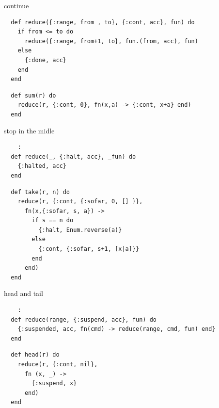 \begin{frame}[fragile]{continue}

  
\begin{verbatim}
  def reduce({:range, from , to}, {:cont, acc}, fun) do
    if from <= to do
      reduce({:range, from+1, to}, fun.(from, acc), fun)
    else
      {:done, acc}
    end
  end
\end{verbatim}

  \pause
  
\begin{verbatim}
  def sum(r) do
    reduce(r, {:cont, 0}, fn(x,a) -> {:cont, x+a} end)
  end
\end{verbatim}

  
\end{frame}

\begin{frame}[fragile]{stop in the midle}

\begin{verbatim}
    :
  def reduce(_, {:halt, acc}, _fun) do
    {:halted, acc}
  end
\end{verbatim}

\pause
\begin{verbatim}
  def take(r, n) do
    reduce(r, {:cont, {:sofar, 0, [] }},
      fn(x,{:sofar, s, a}) ->
        if s == n do
          {:halt, Enum.reverse(a)}
        else
          {:cont, {:sofar, s+1, [x|a]}}
        end
      end)
  end    
\end{verbatim}
  
  
\end{frame}

\begin{frame}[fragile]{ head and tail }

\begin{verbatim}
    :
  def reduce(range, {:suspend, acc}, fun) do
    {:suspended, acc, fn(cmd) -> reduce(range, cmd, fun) end}
  end
\end{verbatim}
  \pause


\begin{verbatim}
  def head(r) do
    reduce(r, {:cont, nil},
      fn (x, _) ->
        {:suspend, x}
      end)
  end
\end{verbatim}
  
\end{frame}

